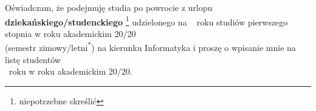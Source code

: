 \documentclass{wmiisubmission}
\begin{document}
\cracowdate
{}
\studentaddress
\addressee{\piotrniemiec}

\vskip 3.0cm


\vskip 0.5cm

Oświadczam, że podejmuję studia po powrocie z urlopu
\textbf{dziekańskiego/studenckiego}
\footnote[1]{niepotrzebne skreślić} udzielonego na \dotfill~ roku
studiów pierwszego stopnia w roku akademickim
20\fillField{0.7cm}/20\fillField{0.7cm}\\
(semestr zimowy/letni\textsuperscript{*})
na kierunku Informatyka i proszę o wpisanie mnie na listę studentów\\
\fillField{3cm}
~roku w roku akademickim 20\fillField{0.7cm}/20\fillField{0.7cm}.

\vskip 2.0cm

\studentsignature
\end{document}
